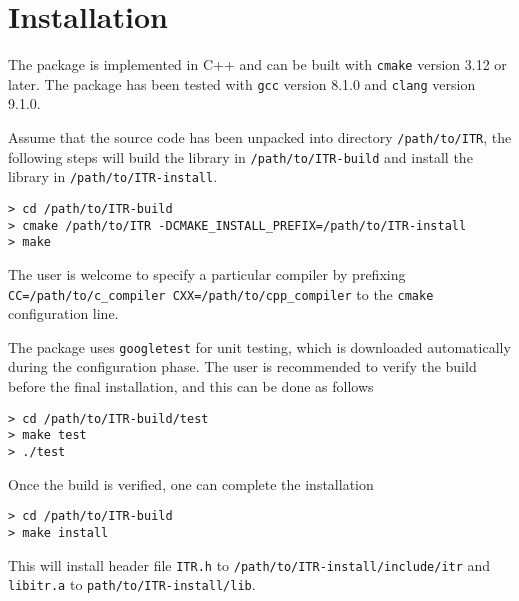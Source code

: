 \chapter{Installation}

The package is implemented in C++ and can be built with {\tt cmake}
version 3.12 or later. The package has been tested with {\tt gcc}
version 8.1.0 and {\tt clang} version 9.1.0. 

Assume that the source code has been unpacked into directory
{\tt /path/to/ITR}, the following steps will build the library in
{\tt /path/to/ITR-build} and install the library in
{\tt /path/to/ITR-install}. 

\begin{verbatim}
> cd /path/to/ITR-build
> cmake /path/to/ITR -DCMAKE_INSTALL_PREFIX=/path/to/ITR-install
> make 
\end{verbatim}

The user is welcome to specify a particular compiler by prefixing
{\tt CC=/path/to/c\_compiler CXX=/path/to/cpp\_compiler} to the
{\tt cmake} configuration line. 

The package uses {\tt googletest} for unit testing, which is
downloaded automatically during the configuration phase. The user is
recommended to verify the build before the final installation, and
this can be done as follows

\begin{verbatim}
> cd /path/to/ITR-build/test
> make test
> ./test
\end{verbatim}

Once the build is verified, one can complete the installation
\begin{verbatim}
> cd /path/to/ITR-build
> make install
\end{verbatim}

This will install header file {\tt ITR.h} to
{\tt /path/to/ITR-install/include/itr} and
{\tt libitr.a} to {\tt path/to/ITR-install/lib}. 
